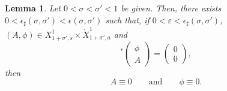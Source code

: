 \documentclass[10pt]{amsart}
\newtheorem{lemm}[theo]{Lemma}\newtheorem{prop}[theo]{Proposition}\newtheorem{coro}[theo]{Corollary}\newtheorem{conj}[theo]{Conjecture}
\theoremstyle{definition}\newtheorem{defi}[theo]{Definition}\newtheorem{rema}[theo]{Remark}\newtheorem{exam}[theo]{Example}\newtheorem{exem}[theo]{Example}\newtheorem{nota}[theo]{Notation}
\newcommand*\e{\varepsilon}
\newcommand*\ep{\epsilon}
\newcommand*\s{\sigma}
\begin{document}
\begin{lemm}\label{adj_inj_plan}
Let $ 0 < \s < \s' < 1 $ be given. Then, there exists $ 0 < \ep_\sharp(\s, \s') < \ep (\s, \s') $ such that, if $
0<\varepsilon<\epsilon_\sharp(\sigma, \sigma')$, $ (A, \phi) \in X^{1}_{ 1+\s', s} \times \dot{X}^{1}_{ 1+ \s',a} $ and
\begin{equation*}
[\Lambda^\e]^*
\begin{pmatrix}
\phi \\ A
\end{pmatrix} =
\begin{pmatrix} 0 \\ 0
\end{pmatrix},
\end{equation*}
then
\[
A \equiv 0
\qquad \text{and} \qquad
\phi \equiv 0.
\]
\end{lemm}
\end{document}
